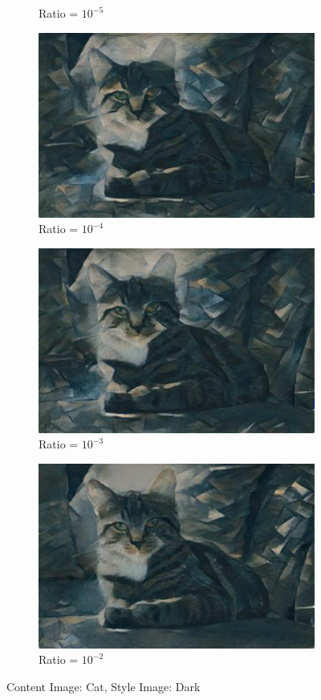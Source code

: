 \documentclass{article}
\begin{document}
\begin{figure}[H]
\begin{subfigure}{.5\textwidth}
  \caption{Ratio = $10^{-5}$}
  \label{fig:sfig3}
\end{subfigure}
\begin{subfigure}{.5\textwidth}
  \centering
  \includegraphics[width=.8\linewidth]{cat_dark1e-03}
  \caption{Ratio = $10^{-4}$}
  \label{fig:sfig4}
\end{subfigure}
\begin{subfigure}{.5\textwidth}
  \centering
  \includegraphics[width=.8\linewidth]{cat_dark1e-02}
  \caption{Ratio = $10^{-3}$}
  \label{fig:sfig5}
\end{subfigure}
\begin{subfigure}{.5\textwidth}
  \centering
  \includegraphics[width=.8\linewidth]{cat_dark1e-01jpg}
  \caption{Ratio = $10^{-2}$}
  \label{fig:sfig6}
\end{subfigure}
\caption{Content Image: Cat, Style Image: Dark}
\label{fig:fig}
\end{figure}
\end{document}
